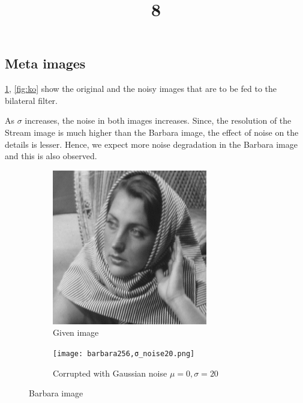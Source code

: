 \documentclass[a4paper, landscape]{article}
\title{8}
\date{}
\begin{document}
\maketitle
\subsection{Meta images}
\ref{fig:bo}, \ref{fig:ko} show the original and the noisy images that are to be fed to  the bilateral filter.

As $\sigma$ increases, the noise in both images increases. 
Since, the resolution of the Stream image is much higher than the Barbara image, the effect of noise on the details is lesser. Hence, we expect more noise degradation in the Barbara image and this is also observed.
\begin{figure}
    \centering
    \begin{subfigure}{0.48\linewidth}
        \centering
        \includegraphics[width=\linewidth]{barbara256.png}
        \caption{Given image}
    \end{subfigure}
    \begin{subfigure}{0.48\linewidth}
        \centering
        \texttt{[image: barbara256,σ\_noise20.png]}
        \caption{Corrupted with Gaussian noise $\mu=0, \sigma=20$}
    \end{subfigure}
    \caption{Barbara image}
    \label{fig:bo}
\end{figure}
\end{document}
